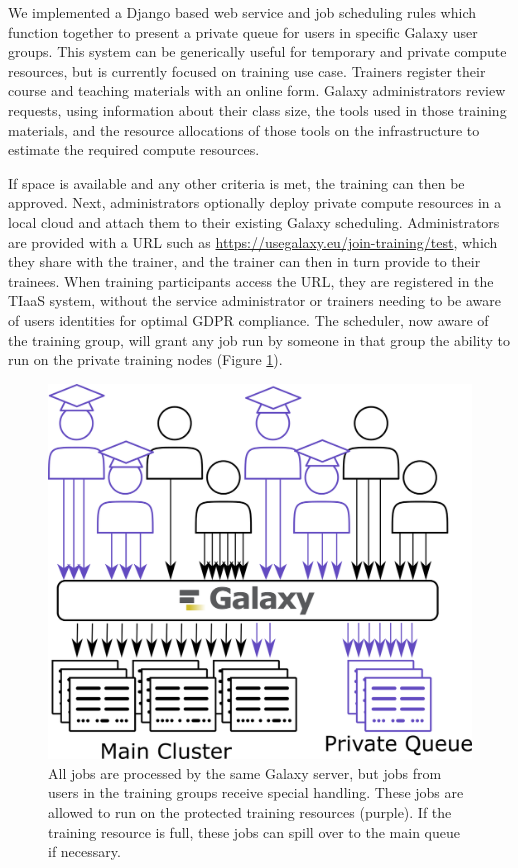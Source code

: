 \documentclass[a4paper,num-refs]{oup-contemporary}
\begin{document}
We implemented a Django based web service and job scheduling rules which function together to present a private queue for users in specific Galaxy user groups. This system can be generically useful for temporary and private compute resources, but is currently focused on training use case. Trainers register their course and teaching materials with an online form. Galaxy administrators review requests, using information about their class size, the tools used in those training materials, and the resource allocations of those tools on the infrastructure to estimate the required compute resources.

If space is available and any other criteria is met, the training can then be approved. Next, administrators optionally deploy private compute resources in a local cloud and attach them to their existing Galaxy scheduling. Administrators are provided with a URL such as \url{https://usegalaxy.eu/join-training/test}, which they share with the trainer, and the trainer can then in turn provide to their trainees. When training participants access the URL, they are registered in the TIaaS system, without the service administrator or trainers needing to be aware of users identities for optimal GDPR compliance. The scheduler, now aware of the training group, will grant any job run by someone in that group the ability to run on the private training nodes (Figure \ref{figure:queue}).

\begin{figure}[bt!]
\centering
\includegraphics[width=\linewidth]{images/rules.png}
\caption{All jobs are processed by the same Galaxy server, but jobs from users in the training groups receive special handling. These jobs are allowed to run on the protected training resources (purple). If the training resource is full, these jobs can spill over to the main queue if necessary.}\label{figure:queue}
\end{figure}
\end{document}
